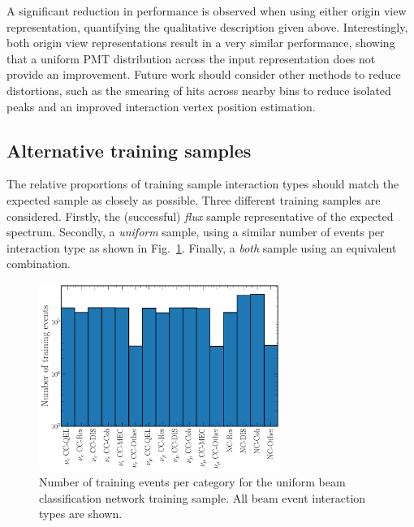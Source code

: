 A significant reduction in performance is observed when using either origin view representation,
quantifying the qualitative description given above. Interestingly, both origin view
representations result in a very similar performance, showing that a uniform PMT distribution
across the input representation does not provide an improvement. Future work should consider other
methods to reduce distortions, such as the smearing of hits across nearby bins to reduce isolated
peaks and an improved interaction vertex position estimation.

\subsection{Alternative training samples} %
\label{sec:results_samples} %

The relative proportions of training sample interaction types should match the expected sample as
closely as possible. Three different training samples are considered. Firstly, the (successful)
\emph{flux} sample representative of the expected spectrum. Secondly, a \emph{uniform} sample,
using a similar number of events per interaction type as shown in
Fig.~\ref{fig:explore_uniform_training_sample}. Finally, a \emph{both} sample using an equivalent
combination.

\begin{figure} %
    \includegraphics[width=0.7\textwidth]{diagrams/7-results/explore_uniform_training_sample.pdf}
    \caption[Number of training events per category for the uniform beam classification network
        training sample] {Number of training events per category for the uniform beam
        classification network training sample. All beam event interaction types are shown.}
    \label{fig:explore_uniform_training_sample}
\end{figure}

